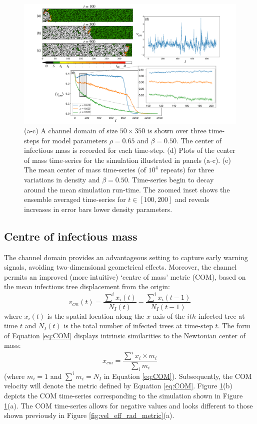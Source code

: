 \newpage

\begin{figure}
    \centering
    \includegraphics[scale=0.30]{chapter4/figures/figure1-channel-domain.pdf}
    \caption{
    (a-c) A channel domain of size $50\times350$ is shown over three time-steps for model parameters $\rho=0.65$ and $\beta=0.50$. 
    The center of infectious mass is recorded for each time-step. 
    (d) Plots of the center of mass time-series for the simulation illustrated in panels (a-c). 
    (e) The mean center of mass time-series (of $10^4$ repeats) for three variations in density and $\beta=0.50$. 
    Time-series begin to decay around the mean simulation run-time.  
    The zoomed inset shows the ensemble averaged time-series for $t\in[100, 200]$ and reveals increases in error bars lower density parameters.
    }
    \label{fig:ews-primer}
\end{figure}

\subsection{Centre of infectious mass}

The channel domain provides an advantageous setting to capture early warning signals, avoiding two-dimensional geometrical effects.
Moreover, the channel permits an improved (more intuitive) `centre of mass' metric (COM), based on the mean infectious tree displacement from the origin:
\begin{equation}
   v_{cm}(t) = \frac{\sum^i x_i(t)}{N_I(t)} - \frac{\sum^i x_i(t-1)}{N_I(t-1)}
   \label{eq:COM}
\end{equation}
where $x_i(t)$ is the spatial location along the $x$ axis of the $ith$ infected tree at 
time $t$ and $N_I(t)$ is the total number of infected trees at time-step $t$. 
 The form of Equation \ref{eq:COM} displays intrinsic similarities to the Newtonian center of mass:
 \[x_{cm} = \frac{\sum^i x_i\times m_i}{\sum_i m_i}\]
(where $m_i=1$ and $\sum^im_i= N_I$ in Equation \ref{eq:COM}).
Subsequently, the COM velocity will denote the metric defined by Equation \ref{eq:COM}. 
Figure \ref{fig:ews-primer}(b) depicts the COM time-series corresponding to the simulation shown in Figure \ref{fig:ews-primer}(a). 
The COM time-series allows for negative values and looks different to those shown previously in Figure \ref{fig:vel_eff_rad_metric}(a).

